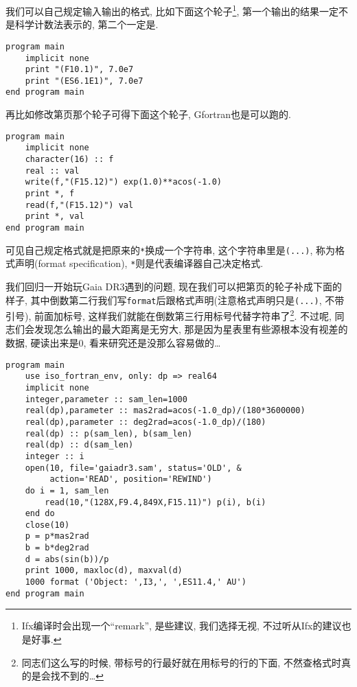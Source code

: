 我们可以自己规定输入输出的格式, 比如下面这个轮子\footnote{Ifx编译时会出现一个``remark'', 是些建议, 我们选择无视, 不过听从Ifx的建议也是好事.}, 第一个输出的结果一定不是科学计数法表示的, 第二个一定是. 
\begin{lstlisting}
program main
    implicit none
    print "(F10.1)", 7.0e7
    print "(ES6.1E1)", 7.0e7
end program main
\end{lstlisting}
再比如修改第\pageref{internal_file}页那个轮子可得下面这个轮子, Gfortran也是可以跑的.
\begin{lstlisting}
program main
    implicit none
    character(16) :: f
    real :: val
    write(f,"(F15.12)") exp(1.0)**acos(-1.0)
    print *, f
    read(f,"(F15.12)") val
    print *, val
end program main
\end{lstlisting}
可见自己规定格式就是把原来的\texttt{*}换成一个字符串, 这个字符串里是\texttt{(...)}, 称为格式声明(format specification), \texttt{*}则是代表编译器自己决定格式.

我们回归一开始玩Gaia DR3遇到的问题, 现在我们可以把第\pageref{gaiadr3.sam}页的轮子补成下面的样子, 其中倒数第二行我们写\texttt{format}后跟格式声明(注意格式声明只是\texttt{(...)}, 不带引号), 前面加标号, 这样我们就能在倒数第三行用标号代替字符串了\footnote{同志们这么写的时候, 带标号的行最好就在用标号的行的下面, 不然查格式时真的是会找不到的\dots}. 不过呢, 同志们会发现怎么输出的最大距离是无穷大, 那是因为星表里有些源根本没有视差的数据, 硬读出来是$0$, 看来研究还是没那么容易做的\dots
\begin{lstlisting}
program main
    use iso_fortran_env, only: dp => real64
    implicit none
    integer,parameter :: sam_len=1000
    real(dp),parameter :: mas2rad=acos(-1.0_dp)/(180*3600000)
    real(dp),parameter :: deg2rad=acos(-1.0_dp)/(180)
    real(dp) :: p(sam_len), b(sam_len)
    real(dp) :: d(sam_len)
    integer :: i
    open(10, file='gaiadr3.sam', status='OLD', &
         action='READ', position='REWIND')
    do i = 1, sam_len
        read(10,"(128X,F9.4,849X,F15.11)") p(i), b(i)
    end do
    close(10)
    p = p*mas2rad
    b = b*deg2rad
    d = abs(sin(b))/p
    print 1000, maxloc(d), maxval(d)
    1000 format ('Object: ',I3,', ',ES11.4,' AU')
end program main
\end{lstlisting}

